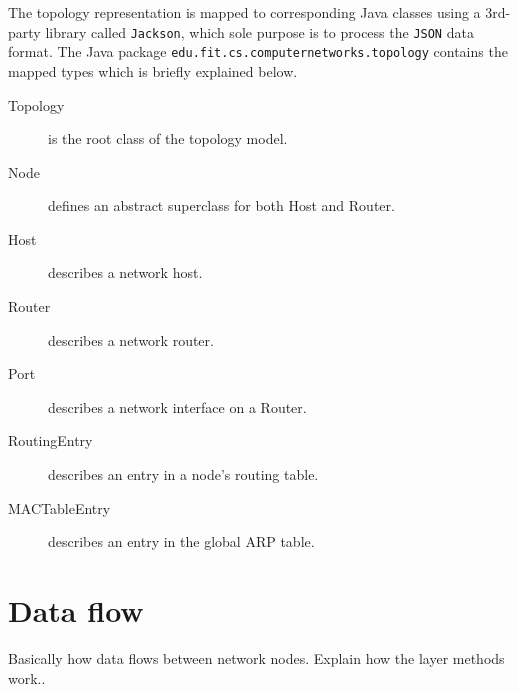 \documentclass{scrartcl}
\begin{document}
The topology representation is mapped to corresponding Java classes using a 3rd-party library called \texttt{Jackson}, which sole purpose is to process the \texttt{JSON} data format. The Java package \texttt{edu.fit.cs.computernetworks.topology} contains the mapped types which is briefly explained below.

\begin{description}
\item[Topology] is the root class of the topology model.
\item[Node] defines an abstract superclass for both Host and Router.
\item[Host] describes a network host.
\item[Router] describes a network router.
\item[Port] describes a network interface on a Router.
\item[RoutingEntry] describes an entry in a node's routing table.
\item[MACTableEntry] describes an entry in the global ARP table.
\end{description}

\section{Data flow}
Basically how data flows between network nodes. Explain how the layer methods work..
\end{document}
